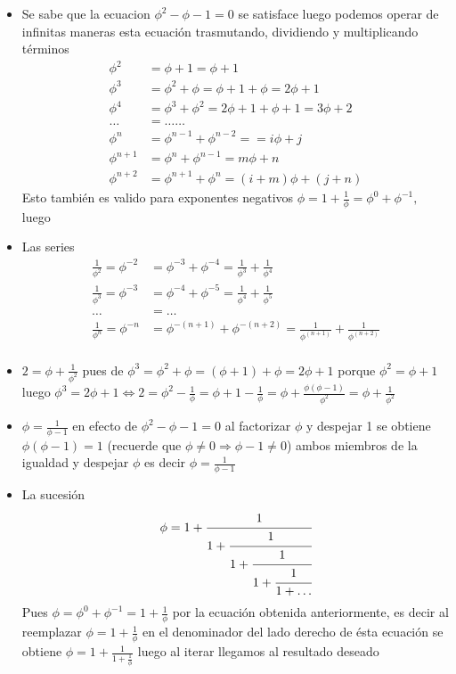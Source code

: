 \documentclass[a4paper]{book}
\newcommand{\qw}{\phi}
\newcommand{\pa}[1]{\left(#1\right)}
\begin{document}
\begin{itemize}
	\item  Se sabe que la ecuacion $\qw^2-\qw-1=0$ se satisface luego podemos operar de infinitas maneras  esta ecuación trasmutando, dividiendo y multiplicando términos \begin{align*}
		\qw^2&=\qw+1=\qw+1\\
		\qw^3&=\qw^2+\qw=\qw+1+\qw=2\qw+1\\
		\qw^4&=\qw^3+\qw^2=2\qw+1+\qw+1=3\qw+2\\
		\ldots &=\ldots\ldots\\
		\qw^n&=\qw^{n-1}+\qw^{n-2}==i\qw+j\\
		\qw^{n+1}&=\qw^{n}+\qw^{n-1}=m\qw+n\\
		\qw^{n+2}&=\qw^{n+1}+\qw^{n}=\pa{i+m}\qw+\pa{j+n}
	\end{align*}
	Esto también es valido para exponentes negativos $\qw=1+\frac{1}{\qw}=\qw^0+\qw^{-1},$  luego

	\item Las series \begin{align*}
		\frac{1}{\qw^{2}}=\qw^{-2}&=\qw^{-3}+\qw^{-4}=\frac{1}{\qw^{3}}+\frac{1}{\qw^{4}}\\
		\frac{1}{\qw^{3}}=\qw^{-3}&=\qw^{-4}+\qw^{-5}=\frac{1}{\qw^{4}}+\frac{1}{\qw^{5}}\\
		\ldots&=\ldots\\
		\frac{1}{\qw^{n}}=\qw^{-n}&=\qw^{-\pa{n+1}}+\qw^{-\pa{n+2}}=\frac{1}{\qw^{\pa{n+1}}}+\frac{1}{\qw^{\pa{n+2}}}\\
	\end{align*}

	\item $2=\qw+\frac{1}{\qw^2}$ pues de $\qw^{3}=\qw^{2}+\qw=\pa{\qw+1}+\qw=2\qw+1$ porque $\qw^{2}=\qw+1$ luego $\qw^{3}=2\qw+1\Longleftrightarrow 2=\qw^2-\frac{1}{\qw}=\qw+1-\frac{1}{\qw}=\qw+\frac{\qw\pa{\qw-1}}{\qw^2}=\qw+\frac{1}{\qw^2}$

	\item $\qw=\frac{1}{\qw-1}$ en efecto de $\qw^2-\qw-1=0$ al factorizar $\qw$ y despejar 1 se obtiene $\phi\pa{\phi-1}=1$ (recuerde que $\qw\neq 0\Longrightarrow \qw-1\neq 0$) ambos miembros de la igualdad y despejar $\qw$ es decir $\qw=\frac{1}{\qw-1}$


	\item La sucesión $$\qw=1+\cfrac{1}{1+\cfrac{1}{1+\cfrac{1}{1+\cfrac{1}{1+\ldots}}}}$$
	Pues $\qw={\qw}^0+{\qw}^{-1}=1+\frac{1}{\qw}$ por la ecuación obtenida anteriormente, es decir al reemplazar $\qw=1+\frac{1}{\qw}$ en el denominador del lado derecho de ésta ecuación se obtiene $\qw=1+\frac{1}{1+\frac{1}{\qw}}$ luego al iterar llegamos al resultado deseado
\end{itemize}
\end{document}
